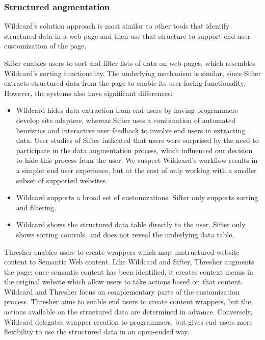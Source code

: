 \documentclass[english]{programming}
\providecommand{\tightlist}{%
  \setlength{\itemsep}{0pt}\setlength{\parskip}{0pt}}
\begin{document}
\hypertarget{structured-augmentation}{%
\subsubsection{Structured augmentation}\label{structured-augmentation}}

Wildcard's solution approach is most similar to other tools that
identify structured data in a web page and then use that structure to
support end user customization of the page.

Sifter \autocite{huynh2006} enables users to sort and filter lists of
data on web pages, which resembles Wildcard's sorting functionality. The
underlying mechanism is similar, since Sifter extracts structured data
from the page to enable its user-facing functionality. However, the
systems also have significant differences:

\begin{itemize}
\tightlist
\item
  Wildcard hides data extraction from end users by having programmers
  develop site adapters, whereas Sifter uses a combination of automated
  heuristics and interactive user feedback to involve end users in
  extracting data. User studies of Sifter indicated that users were
  surprised by the need to participate in the data augmentation process,
  which influenced our decision to hide this process from the user. We
  suspect Wildcard's workflow results in a simpler end user experience,
  but at the cost of only working with a smaller subset of supported
  websites.
\item
  Wildcard supports a broad set of customizations. Sifter only supports
  sorting and filtering.
\item
  Wildcard shows the structured data table directly to the user. Sifter
  only shows sorting controls, and does not reveal the underlying data
  table.
\end{itemize}

Thresher \autocite{hogue2005} enables users to create wrappers which map
unstructured website content to Semantic Web content. Like Wildcard and
Sifter, Thresher augments the page: once semantic content has been
identified, it creates context menus in the original website which allow
users to take actions based on that content. Wildcard and Thresher focus
on complementary parts of the customization process. Thresher aims to
enable end users to create content wrappers, but the actions available
on the structured data are determined in advance. Conversely, Wildcard
delegates wrapper creation to programmers, but gives end users more
flexibility to use the structured data in an open-ended way.
\end{document}
